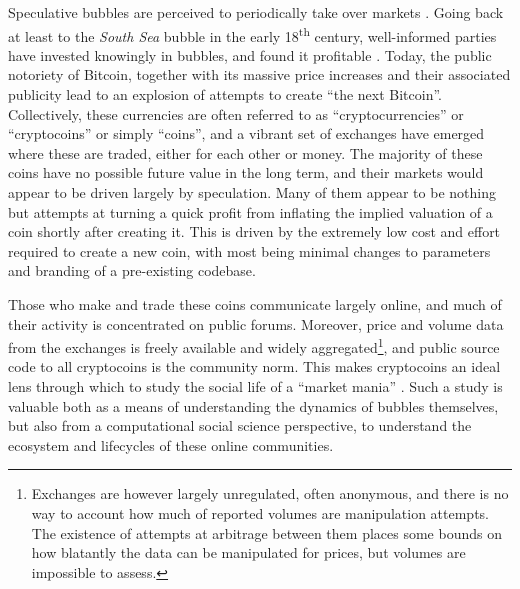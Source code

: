 
Speculative bubbles are perceived to periodically take over markets \cite{garber2001famous}.
Going back at least to the \emph{South Sea} bubble in the early 18\textsuperscript{th} century, well-informed parties  have invested knowingly in bubbles, and found it profitable \cite{temin2004riding}.
Today, the public notoriety of Bitcoin, together with its massive price increases and their associated publicity lead to an explosion of attempts to create ``the next Bitcoin''.
Collectively, these currencies are often referred to as ``cryptocurrencies'' or ``cryptocoins'' or simply ``coins'', and a vibrant set of exchanges have emerged where these are traded, either for each other or money.
The majority of these coins have no possible future value in the long term, and their markets would appear to be driven largely by speculation.
Many of them appear to be nothing but attempts at turning a quick profit from inflating the implied valuation of a coin shortly after creating it.
This is driven by the extremely low cost and effort required to create a new coin, with most being minimal changes to parameters and branding of a pre-existing codebase.

Those who make and trade these coins communicate largely online, and much of their activity is concentrated on public forums. 
Moreover, price and volume data from the exchanges is freely available and widely aggregated\footnote{Exchanges are however largely unregulated, often anonymous, and there is no way to account how much of reported volumes are manipulation attempts. The existence of attempts at arbitrage between them places some bounds on how blatantly the data can be manipulated for prices, but volumes are impossible to assess. },
and public source code to all cryptocoins is the community norm. This makes cryptocoins
an ideal lens through which to study the social life of a ``market mania'' \cite{cosma2008}.
Such a study is valuable both as a means of understanding the dynamics of bubbles themselves, but also from a computational social science perspective, to understand the ecosystem and lifecycles of these online communities.

